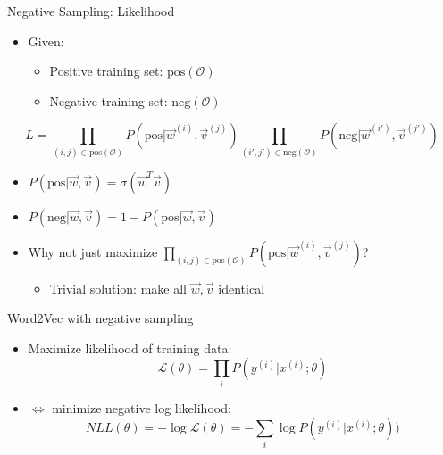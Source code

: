 \begin{vbframe}{Negative Sampling: Likelihood}

\vfill

\begin{itemize}
	\item Given:
		\begin{itemize}
			\item Positive training set: $\mathrm{pos}(\mathcal{O})$
			\item Negative training set: $\mathrm{neg}(\mathcal{O})$
		\end{itemize}
\end{itemize}

	$$ L = \prod_{(i,j) \in \mathrm{pos}(\mathcal{O})} P(\mathrm{pos}|\vec w^{(i)}, \vec v^{(j)}) \prod_{(i',j') \in \mathrm{neg}(\mathcal{O})} P(\mathrm{neg}|\vec w^{(i')},\vec v^{(j')} ) $$
	
\begin{itemize}
	\item $P(\mathrm{pos}|\vec w, \vec v) = \sigma(\vec w^T \vec v)$
	\item $P(\mathrm{neg}|\vec w, \vec v) = 1-P(\mathrm{pos}|\vec w, \vec v)$
	\item \ques Why not just maximize $\displaystyle \prod_{(i,j) \in \mathrm{pos}(\mathcal{O})} P(\mathrm{pos}|\vec w^{(i)}, \vec v^{(j)}) $?
		\begin{itemize}
		\item Trivial solution: make all $\vec w, \vec v$ identical
		\end{itemize}
\end{itemize}

\vfill

\end{vbframe}


\begin{vbframe}{Word2Vec with negative sampling}

\vfill

\begin{itemize}
	\item Maximize likelihood of training data:
	$$\mathcal{L}(\theta) = \prod_{i} P(y^{(i)}|x^{(i)}; \theta)$$
	\item[] $\Leftrightarrow$ minimize negative log likelihood:
	$$NLL(\theta) = - \log \mathcal{L}(\theta) = - \sum_{i} \log P(y^{(i)}|x^{(i)}; \theta))$$
\end{itemize}

\vfill

\end{vbframe}

